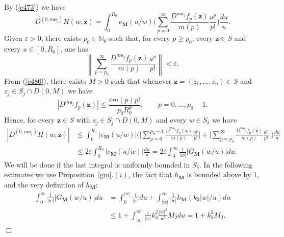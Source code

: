 \documentclass[11pt,a4paper,leqno]{article}
\theoremstyle{plain}
\theoremstyle{definition}
\newenvironment{proof1}{\medskip\par\noindent{\bf Proof}}{\hfill $\Box$
\medskip\par}
\def\N{\mathbb{N}}
\def\be{\boldsymbol{e}}
\def\bM{\boldsymbol{M}}
\def\bz{\boldsymbol{z}}
\begin{document}
\begin{proof1}
By (\ref{e473}) we have
\begin{equation*}
D^{(0,m\be_{j})}H(w,\bz)= \int_{0}^{R_0}e_{\bM}(u/w) \Big(\sum_{p=0}^{\infty}\frac{D^{m\be_{j}}f_{p}(\bz)}{m(p)}\frac{u^{p}}{p!}\Big)\frac{du}{u}.
\end{equation*}
Given $\varepsilon>0$, there exists $p_{0}\in\N_0$ such that, for every $p\ge p_0$, every $\bz\in S$ and every $u\in [0, R_0]$, one has
$$
\left\|\sum_{p=p_0}^{\infty}\frac{D^{m\be_{j}}f_{p}(\bz)}{m(p)}\frac{u^{p}}{p!}\right\|<\varepsilon.$$
From (\ref{e480}), there exists $M>0$ such that whenever $\bz=(z_1,...,z_n)\in S$ and $z_{j}\in S_{j}\cap D(0,M)$ we have
$$\left|D^{m\be_{j}}f_{p}(\bz)\right|\le\frac{\varepsilon m(p)p!}{p_0R_0^{p}},\qquad p=0,\ldots,p_0-1.$$
Hence, for every $\bz\in S$ with $z_{j}\in S_{j}\cap D(0,M)$ and every $w\in S_{\delta}$ we have
\begin{align*}
\left|	D^{(0,m\be_j)}H(w,\bz)\right|&\le \int_{0}^{R_0}|e_{\bM}(u/w)|\Big(\Big|\sum_{p=0}^{p_0-1}\frac{D^{m\be_{j}}f_{p}(\bz)}{m(p)} \frac{u^{p}}{p!}\Big|+\Big|\sum_{p=p_0}^{\infty}\frac{D^{m\be_{j}}f_{p}(\bz)}{m(p)} \frac{u^{p}}{p!}\Big|\Big)\frac{du}{u}\\
&\le 2\varepsilon\int_{0}^{R_0}|e_{\bM}(u/w)|\frac{du}{u}=
2\varepsilon\int_0^{\infty}\frac{1}{|w|}|G_{\bM}(w/u)|du.
\end{align*}
We will be done if the last integral is uniformly bounded in $S_{\delta}$. In the following estimates we use Proposition~\ref{gm}.$(i)$, the fact that $h_{\bM}$ is bounded above by 1, and the very definition of $h_{\bM}$:
\begin{align*}
\int_0^{\infty}\frac{1}{|w|}|G_{\bM}(w/u)|du&= \int_0^{|w|}\frac{1}{|w|}du+\int_{|w|}^{\infty}\frac{1}{|w|}h_{\bM}(k_3|w|/u)du\\
&\le 1+\int_{|w|}^{\infty}\frac{1}{|w|}k_3^2\frac{|w|^2}{u^2}M_2du=1+k_3^2M_2.
\end{align*}
\end{proof1}
\end{document}
